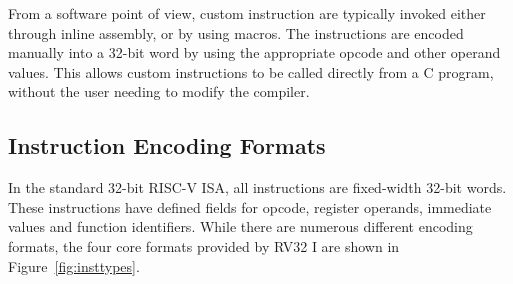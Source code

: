 From a software point of view, custom instruction are typically invoked either through inline assembly, or by using macros. The instructions are encoded manually into a 32-bit word by using the appropriate opcode and other operand values. This allows custom instructions to be called directly from a C program, without the user needing to modify the compiler.

\subsection{Instruction Encoding Formats} %
\label{sec:riscv_encoding}

In the standard 32-bit RISC-V ISA, all instructions are fixed-width 32-bit words. These instructions have defined fields for opcode, register operands, immediate values and function identifiers. While there are numerous different encoding formats, the four core formats provided by RV32 I are shown in Figure~\ref{fig:insttypes}. 

